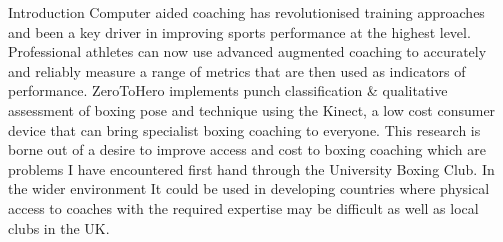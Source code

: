\documentclass[ %
                    author={Liam O'Shea},
                supervisor={Dr. Sion Hanunna},
                     title={ZeroToHero},
                  subtitle={},
                    degree={Bsc},
                      year={2014} ]{poster}
\begin{document}

\begin{frame}{} 

\vfill

\begin{columns}[t]
    \begin{column}{0.900\linewidth}
    \begin{block}{\normalsize Introduction}
    \small Computer aided coaching has revolutionised training approaches and been a key driver
            in improving sports performance at the highest level. Professional athletes can now use
            advanced augmented coaching to accurately and reliably measure a range of metrics that
            are then used as indicators of performance. ZeroToHero implements punch classification \& qualitative assessment of boxing pose and technique using the Kinect, a low cost consumer device that can bring specialist boxing coaching to everyone.{\newline}
            This research is borne out of a desire to improve access and cost to boxing coaching which are problems I have encountered first hand through the University Boxing Club. In the wider environment It could be used in developing countries where physical access to coaches with the
            required expertise may be difficult as well as local clubs in the UK.

    \end{block}
    \end{column}
\end{columns}

\vfill


\end{frame}
\end{document}
